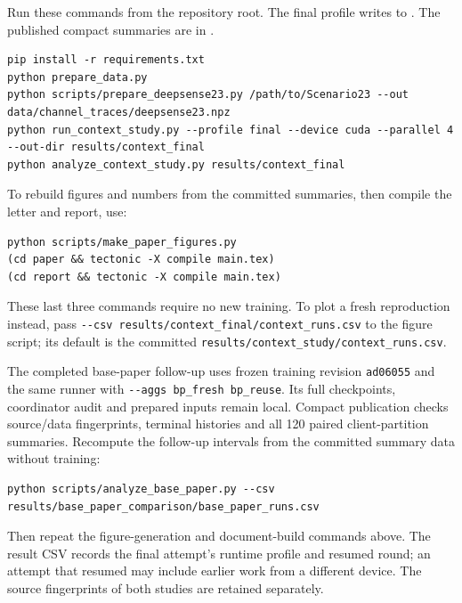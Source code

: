 Run these commands from the repository root. The final profile writes to
. The published compact summaries are in
.
\begin{lstlisting}
pip install -r requirements.txt
python prepare_data.py
python scripts/prepare_deepsense23.py /path/to/Scenario23 --out data/channel_traces/deepsense23.npz
python run_context_study.py --profile final --device cuda --parallel 4 --out-dir results/context_final
python analyze_context_study.py results/context_final
\end{lstlisting}
To rebuild figures and numbers from the committed summaries, then compile the
letter and report, use:
\begin{lstlisting}
python scripts/make_paper_figures.py
(cd paper && tectonic -X compile main.tex)
(cd report && tectonic -X compile main.tex)
\end{lstlisting}
These last three commands require no new training. To plot a fresh reproduction
instead, pass \lstinline|--csv results/context_final/context_runs.csv| to the
figure script; its default is the committed
\texttt{results/context\_study/context\_runs.csv}.

The completed base-paper follow-up uses frozen training revision
\texttt{ad06055} and the same runner with
\lstinline|--aggs bp_fresh bp_reuse|. Its full checkpoints, coordinator audit and
prepared inputs remain local. Compact publication checks source/data fingerprints,
terminal histories and all 120 paired client-partition summaries. Recompute the
follow-up intervals from the committed summary data without training:
\begin{lstlisting}
python scripts/analyze_base_paper.py --csv results/base_paper_comparison/base_paper_runs.csv
\end{lstlisting}
Then repeat the figure-generation and document-build commands above. The result
CSV records the final attempt's runtime
profile and resumed round; an attempt that resumed may include earlier work from a
different device. The source fingerprints of both studies are retained separately.
